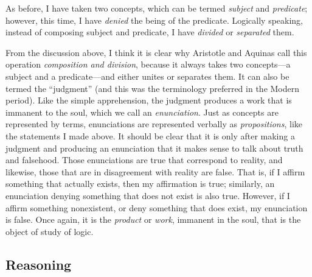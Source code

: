 \documentclass[
  12pt,
]{memoir}
\begin{document}
As before, I have taken two concepts, which can be termed \emph{subject}
and \emph{predicate}; however, this time, I have \emph{denied} the being
of the predicate. Logically speaking, instead of composing subject and
predicate, I have \emph{divided} or \emph{separated} them.

From the discussion above, I think it is clear why Aristotle and Aquinas
call this operation \emph{composition and division}, because it always
takes two concepts---a subject and a predicate---and either unites or
separates them. It can also be termed the ``judgment'' (and this was the
terminology preferred in the Modern period). Like the simple
apprehension, the judgment produces a work that is immanent to the soul,
which we call an \emph{enunciation}. Just as concepts are represented by
terms, enunciations are represented verbally as \emph{propositions},
like the statements I made above. It should be clear that it is only
after making a judgment and producing an enunciation that it makes sense
to talk about truth and falsehood. Those enunciations are true that
correspond to reality, and likewise, those that are in disagreement with
reality are false. That is, if I affirm something that actually exists,
then my affirmation is true; similarly, an enunciation denying something
that does not exist is also true. However, if I affirm something
nonexistent, or deny something that does exist, my enunciation is false.
Once again, it is the \emph{product} or \emph{work}, immanent in the
soul, that is the object of study of logic.

\subsection{Reasoning}\label{reasoning}
\end{document}
